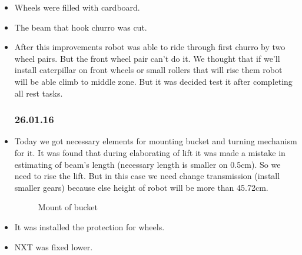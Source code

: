 \begin{itemize}
	\item Wheels were filled with cardboard.
	
	\item The beam that hook churro was cut.
	
	\item After this improvements robot was able to ride through first churro by two wheel pairs. But the front wheel pair can't do it. We thought that if we'll install caterpillar on front wheels or small rollers that will rise them robot will be able climb to middle zone. But it was decided test it after completing all rest tasks.
	\subsubsection{26.01.16}	
		\item Today we got necessary elements for mounting bucket and turning mechanism for it. It was found that during elaborating of lift it was made a mistake in estimating of beam's length (necessary length is smaller on 0.5cm). So we need to rise the lift. But in this case we need change transmission (install smaller gears) because else height of robot will be more than 45.72cm.
		\begin{figure}[H]
			\begin{minipage}[h]{1\linewidth}
				\caption{Mount of bucket}
			\end{minipage}
		\end{figure}
		
		\item It was installed the protection for wheels.
		
		\item NXT was fixed lower.

\end{itemize}
